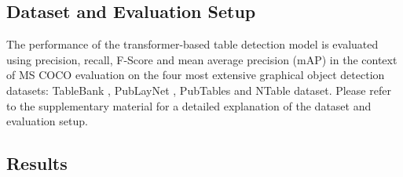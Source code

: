 \documentclass[sn-mathphys]{sn-jnl}\jyear{2021}\theoremstyle{thmstyleone}\newtheorem{theorem}{Theorem}\newtheorem{proposition}[theorem]{Proposition}\theoremstyle{thmstyletwo}\newtheorem{example}{Example}\newtheorem{remark}{Remark}\theoremstyle{thmstylethree}\newtheorem{definition}{Definition}\usepackage{amsmath}
\begin{document}
\subsection{Dataset and Evaluation Setup}
The performance of the transformer-based table detection model is evaluated using precision, recall, F-Score and mean average precision (mAP) in the context of MS COCO \cite{coco14} evaluation on the four most extensive graphical object detection datasets: TableBank \cite{tablebank8}, PubLayNet \cite{PubLayNet3}, PubTables \cite{pubtables5} and NTable \cite{NTables} dataset. Please refer to the supplementary material for a detailed explanation of the dataset and evaluation setup.

\subsection{Results}   
\end{document}
